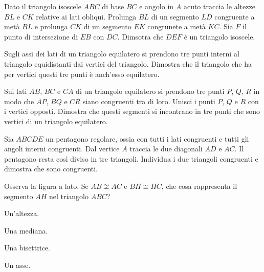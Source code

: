 \begin{multicols}{2}
\begin{esercizio}
\label{ese:2.92}
Dato il triangolo isoscele $ABC$ di base $BC$ e angolo in $A$ acuto 
traccia le altezze $BL$ e $CK$ relative ai lati obliqui. Prolunga 
$BL$ di un segmento $LD$ congruente a metà $BL$ e prolunga $CK$ di un 
segmento $EK$ congrunete a metà $KC$. Sia $F$ il punto di 
intersezione di $EB$ con $DC$. Dimsotra che $DEF$ è un triangolo 
isoscele.
\end{esercizio}

\begin{esercizio}
\label{ese:2.93}
Sugli assi dei lati di un triangolo equilatero si prendono tre punti 
interni al triangolo equidistanti dai vertici del triangolo. Dimostra 
che il triangolo che ha per vertici questi tre punti è anch'esso 
equilatero.
\end{esercizio}

\begin{esercizio}
\label{ese:2.94}
Sui lati $AB$, $BC$ e $CA$ di un triangolo equilatero si prendono tre 
punti $P$, $Q$, $R$ in modo che $AP$, $BQ$ e $CR$ siano congruenti 
tra di loro. Unisci i punti $P$, $Q$ e $R$ con i vertici opposti. 
Dimostra che questi segmenti si incontrano in tre punti che sono 
vertici di un triangolo equilatero.
\end{esercizio}

\begin{esercizio}
\label{ese:2.95}
Sia $ABCDE$ un pentagono regolare, ossia con tutti i lati congruenti 
e tutti gli angoli interni congruenti. Dal vertice $A$ traccia le due 
diagonali $AD$ e $AC$. Il pentagono resta così diviso in tre 
triangoli. Individua i due triangoli congruenti e dimostra che sono 
congruenti.
\end{esercizio}


\end{multicols}

\begin{esercizio}
\label{ese:2.99}
Osserva la figura a lato. Se $AB\not\cong AC$ e $BH\cong HC$, che 
cosa rappresenta il segmento $AH$ nel triangolo $ABC$?\\
\begin{minipage}{.5\linewidth}
\begin{enumeratea}
\item Un'altezza.
\item Una mediana.
\item Una bisettrice.
\item Un asse.
\end{enumeratea}
\end{minipage}\hfil
\begin{minipage}{.2\linewidth}
  \centering
    
\end{minipage}
\end{esercizio}

